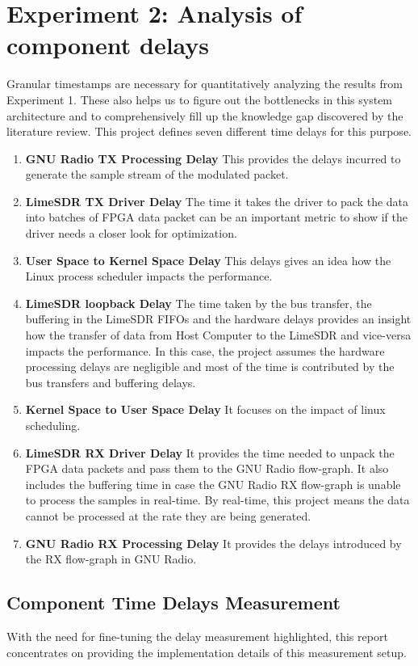 \section{Experiment 2: Analysis of component delays}
Granular timestamps are necessary for quantitatively analyzing the results from Experiment 1.
These also helps us to figure out the bottlenecks in this system architecture and to comprehensively fill up the knowledge gap discovered by the literature review.
This project defines seven different time delays for this purpose.
\begin{enumerate}
    \item {\textbf{GNU Radio TX Processing Delay} This provides the delays incurred to generate the sample stream of the modulated packet.}
    \item{\textbf{LimeSDR TX Driver Delay} The time it takes the driver to pack the data into batches of FPGA data packet can be an important metric to show if the driver needs a closer look for optimization. } 
    \item{\textbf{User Space to Kernel Space Delay} This delays gives an idea how the Linux process scheduler impacts the performance.
    }
    \item{\textbf{LimeSDR loopback Delay} The time taken by the bus transfer, the buffering in the LimeSDR FIFOs  and the hardware delays provides an insight how the transfer of  data from Host Computer to the LimeSDR and vice-versa impacts the performance.
    In this case, the project assumes the hardware processing delays are negligible and most of the time is contributed by the bus transfers and buffering delays.
    }
    \item{\textbf{Kernel Space to User Space Delay} It focuses on the impact of linux scheduling.
    }
    \item{\textbf{LimeSDR RX Driver Delay} It provides the time needed to unpack the FPGA data packets and pass them to the GNU Radio flow-graph.
    It also includes the buffering time in case the GNU Radio RX flow-graph is unable to process the samples in real-time.
    By real-time, this project means the data cannot be processed at the rate they are being generated.}
    \item{\textbf{GNU Radio RX Processing Delay} It provides the delays introduced by the RX flow-graph in GNU Radio.}
    
\end{enumerate}

\subsection{Component Time Delays Measurement}
 With the need for fine-tuning the delay measurement highlighted, this report concentrates on providing the implementation details of this measurement setup.\\
 
